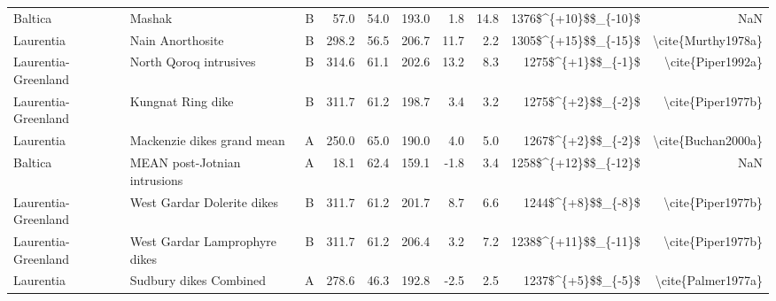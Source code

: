 \begin{longtable}{p{1 in}p{1 in}rrrrrrrr}
                       Baltica &                                             Mashak &      B &      57.0 &      54.0 & 193.0 &   1.8 &      14.8 &   1376\$\textasciicircum \{+10\}\$\$\_\{-10\}\$ &                                                NaN \\
                     Laurentia &                                   Nain Anorthosite &      B &     298.2 &      56.5 & 206.7 &  11.7 &       2.2 &   1305\$\textasciicircum \{+15\}\$\$\_\{-15\}\$ &                                 \textbackslash cite\{Murthy1978a\} \\
           Laurentia-Greenland &                             North Qoroq intrusives &      B &     314.6 &      61.1 & 202.6 &  13.2 &       8.3 &     1275\$\textasciicircum \{+1\}\$\$\_\{-1\}\$ &                                  \textbackslash cite\{Piper1992a\} \\
           Laurentia-Greenland &                                  Kungnat Ring dike &      B &     311.7 &      61.2 & 198.7 &   3.4 &       3.2 &     1275\$\textasciicircum \{+2\}\$\$\_\{-2\}\$ &                                  \textbackslash cite\{Piper1977b\} \\
                     Laurentia &                         Mackenzie dikes grand mean &      A &     250.0 &      65.0 & 190.0 &   4.0 &       5.0 &     1267\$\textasciicircum \{+2\}\$\$\_\{-2\}\$ &                                 \textbackslash cite\{Buchan2000a\} \\
                       Baltica &                       MEAN post-Jotnian intrusions &      A &      18.1 &      62.4 & 159.1 &  -1.8 &       3.4 &   1258\$\textasciicircum \{+12\}\$\$\_\{-12\}\$ &                                                NaN \\
           Laurentia-Greenland &                         West Gardar Dolerite dikes &      B &     311.7 &      61.2 & 201.7 &   8.7 &       6.6 &     1244\$\textasciicircum \{+8\}\$\$\_\{-8\}\$ &                                  \textbackslash cite\{Piper1977b\} \\
           Laurentia-Greenland &                      West Gardar Lamprophyre dikes &      B &     311.7 &      61.2 & 206.4 &   3.2 &       7.2 &   1238\$\textasciicircum \{+11\}\$\$\_\{-11\}\$ &                                  \textbackslash cite\{Piper1977b\} \\
                     Laurentia &                             Sudbury dikes Combined &      A &     278.6 &      46.3 & 192.8 &  -2.5 &       2.5 &     1237\$\textasciicircum \{+5\}\$\$\_\{-5\}\$ &                                 \textbackslash cite\{Palmer1977a\} \\

\end{longtable}
